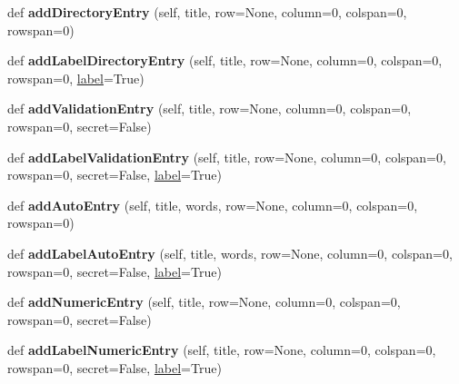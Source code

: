 \begin{DoxyCompactItemize}
\item 
\mbox{\label{classappjar_1_1gui_aa9b5301fd91c3bef23f3ea31f995e3d4}} 
def {\bfseries add\+Directory\+Entry} (self, title, row=None, column=0, colspan=0, rowspan=0)
\item 
\mbox{\label{classappjar_1_1gui_adb9d71bd3ab6e14b6deb8724944b1bc7}} 
def {\bfseries add\+Label\+Directory\+Entry} (self, title, row=None, column=0, colspan=0, rowspan=0, \hyperlink{classappjar_1_1gui_a161659a9096715ced2da924ab88ddecc}{label}=True)
\item 
\mbox{\label{classappjar_1_1gui_ae66047cfbf325fdf08d673bb797a6aab}} 
def {\bfseries add\+Validation\+Entry} (self, title, row=None, column=0, colspan=0, rowspan=0, secret=False)
\item 
\mbox{\label{classappjar_1_1gui_a469d60eab3cf827d0a4ffc29661adb62}} 
def {\bfseries add\+Label\+Validation\+Entry} (self, title, row=None, column=0, colspan=0, rowspan=0, secret=False, \hyperlink{classappjar_1_1gui_a161659a9096715ced2da924ab88ddecc}{label}=True)
\item 
\mbox{\label{classappjar_1_1gui_aa60ec76d9d53fd5ed3d1ba3840d82a17}} 
def {\bfseries add\+Auto\+Entry} (self, title, words, row=None, column=0, colspan=0, rowspan=0)
\item 
\mbox{\label{classappjar_1_1gui_a3c30990275fdceb990cd6ebbc9221bff}} 
def {\bfseries add\+Label\+Auto\+Entry} (self, title, words, row=None, column=0, colspan=0, rowspan=0, secret=False, \hyperlink{classappjar_1_1gui_a161659a9096715ced2da924ab88ddecc}{label}=True)
\item 
\mbox{\label{classappjar_1_1gui_a261c9713b8d550972ad5440e73f49539}} 
def {\bfseries add\+Numeric\+Entry} (self, title, row=None, column=0, colspan=0, rowspan=0, secret=False)
\item 
\mbox{\label{classappjar_1_1gui_a33e8d7e39bb7746eb38733c3ab7d1327}} 
def {\bfseries add\+Label\+Numeric\+Entry} (self, title, row=None, column=0, colspan=0, rowspan=0, secret=False, \hyperlink{classappjar_1_1gui_a161659a9096715ced2da924ab88ddecc}{label}=True)

\end{DoxyCompactItemize}
